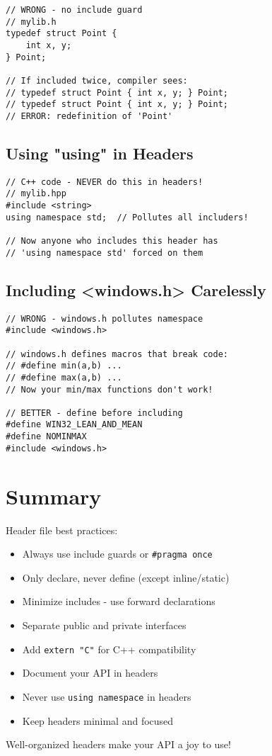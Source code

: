 \begin{lstlisting}
// WRONG - no include guard
// mylib.h
typedef struct Point {
    int x, y;
} Point;

// If included twice, compiler sees:
// typedef struct Point { int x, y; } Point;
// typedef struct Point { int x, y; } Point;
// ERROR: redefinition of 'Point'
\end{lstlisting}

\subsection{Using "using" in Headers}

\begin{lstlisting}
// C++ code - NEVER do this in headers!
// mylib.hpp
#include <string>
using namespace std;  // Pollutes all includers!

// Now anyone who includes this header has
// 'using namespace std' forced on them
\end{lstlisting}

\subsection{Including <windows.h> Carelessly}

\begin{lstlisting}
// WRONG - windows.h pollutes namespace
#include <windows.h>

// windows.h defines macros that break code:
// #define min(a,b) ...
// #define max(a,b) ...
// Now your min/max functions don't work!

// BETTER - define before including
#define WIN32_LEAN_AND_MEAN
#define NOMINMAX
#include <windows.h>
\end{lstlisting}

\section{Summary}

Header file best practices:

\begin{itemize}
    \item Always use include guards or \texttt{\#pragma once}
    \item Only declare, never define (except inline/static)
    \item Minimize includes - use forward declarations
    \item Separate public and private interfaces
    \item Add \texttt{extern "C"} for C++ compatibility
    \item Document your API in headers
    \item Never use \texttt{using namespace} in headers
    \item Keep headers minimal and focused
\end{itemize}

Well-organized headers make your API a joy to use!
